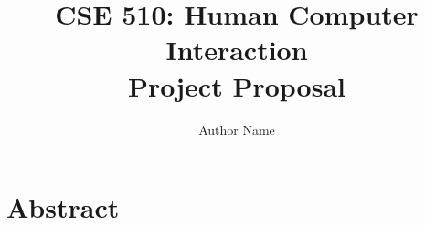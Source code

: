 \documentclass[notitlepage]{article}
\date{}
\title{{\large CSE 510: Human Computer Interaction}\\ Project Proposal}
\author{Author Name}
\begin{document}
\maketitle

\section{Abstract}


\end{document}
